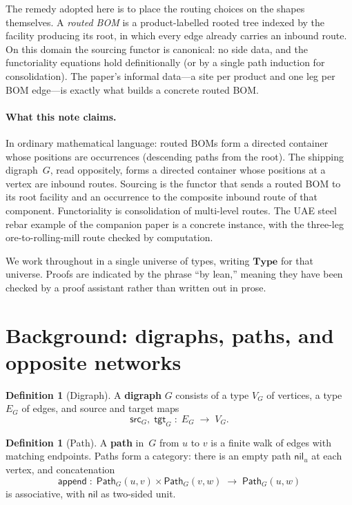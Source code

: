 \documentclass[11pt,a4paper]{article}
\theoremstyle{plain}
\theoremstyle{definition}
\newtheorem{definition}[theorem]{Definition}
\newcommand{\Type}{\mathbf{Type}}
\begin{document}
The remedy adopted here is to place the routing choices on the shapes
themselves. A \emph{routed BOM} is a product-labelled rooted tree indexed
by the facility producing its root, in which every edge already carries
an inbound route. On this domain the sourcing functor is canonical: no
side data, and the functoriality equations hold definitionally (or by a
single path induction for consolidation). The paper's informal data---a
site per product and one leg per BOM edge---is exactly what builds a
concrete routed BOM.

\paragraph{What this note claims.}
In ordinary mathematical language: routed BOMs form a directed container
whose positions are occurrences (descending paths from the root). The
shipping digraph~$G$, read oppositely, forms a directed container whose
positions at a vertex are inbound routes. Sourcing is the functor that
sends a routed BOM to its root facility and an occurrence to the
composite inbound route of that component. Functoriality is consolidation
of multi-level routes. The UAE steel rebar example of the companion paper
is a concrete instance, with the three-leg ore-to-rolling-mill route
checked by computation.

We work throughout in a single universe of types, writing $\Type$ for that
universe. Proofs are indicated by the phrase ``by lean,'' meaning they
have been checked by a proof assistant rather than written out in prose.

\section{Background: digraphs, paths, and opposite networks}

\begin{definition}[Digraph]\label{def:digraph}
A \textbf{digraph} $G$ consists of a type $V_G$ of vertices, a type $E_G$
of edges, and source and target maps
\[
  \mathsf{src}_G,\;\mathsf{tgt}_G \;:\; E_G \;\longrightarrow\; V_G.
\]
\end{definition}

\begin{definition}[Path]\label{def:path}
A \textbf{path} in~$G$ from $u$ to $v$ is a finite walk of edges with
matching endpoints. Paths form a category: there is an empty path
$\mathsf{nil}_u$ at each vertex, and concatenation
\[
  \mathsf{append} \;:\;
  \mathsf{Path}_G(u,v) \times \mathsf{Path}_G(v,w)
  \;\longrightarrow\;
  \mathsf{Path}_G(u,w)
\]
is associative, with $\mathsf{nil}$ as two-sided unit.
\end{definition}
\end{document}
